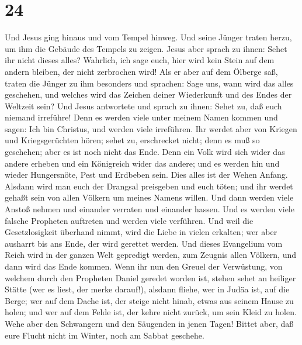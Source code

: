 \hypertarget{section-23}{%
\section{24}\label{section-23}}

 Und Jesus ging hinaus und vom Tempel hinweg. Und seine
Jünger traten herzu, um ihm die Gebäude des Tempels zu zeigen.
 Jesus aber sprach zu ihnen: Sehet ihr nicht dieses alles?
Wahrlich, ich sage euch, hier wird kein Stein auf dem andern bleiben,
der nicht zerbrochen wird!  Als er aber auf dem Ölberge
saß, traten die Jünger zu ihm besonders und sprachen: Sage uns, wann
wird das alles geschehen, und welches wird das Zeichen deiner
Wiederkunft und des Endes der Weltzeit sein?  Und Jesus
antwortete und sprach zu ihnen: Sehet zu, daß euch niemand irreführe!
 Denn es werden viele unter meinem Namen kommen und sagen:
Ich bin Christus, und werden viele irreführen.  Ihr werdet
aber von Kriegen und Kriegsgerüchten hören; sehet zu, erschrecket nicht;
denn es muß so geschehen; aber es ist noch nicht das Ende.
 Denn ein Volk wird sich wider das andere erheben und ein
Königreich wider das andere; und es werden hin und wieder Hungersnöte,
Pest und Erdbeben sein.  Dies alles ist der Wehen Anfang.
 Alsdann wird man euch der Drangsal preisgeben und euch
töten; und ihr werdet gehaßt sein von allen Völkern um meines Namens
willen.  Und dann werden viele Anstoß nehmen und einander
verraten und einander hassen.  Und es werden viele
falsche Propheten auftreten und werden viele verführen. 
Und weil die Gesetzlosigkeit überhand nimmt, wird die Liebe in vielen
erkalten;  wer aber ausharrt bis ans Ende, der wird
gerettet werden.  Und dieses Evangelium vom Reich wird in
der ganzen Welt gepredigt werden, zum Zeugnis allen Völkern, und dann
wird das Ende kommen.  Wenn ihr nun den Greuel der
Verwüstung, von welchem durch den Propheten Daniel geredet worden ist,
stehen sehet an heiliger Stätte (wer es liest, der merke darauf!),
 alsdann fliehe, wer in Judäa ist, auf die Berge;
 wer auf dem Dache ist, der steige nicht hinab, etwas aus
seinem Hause zu holen;  und wer auf dem Felde ist, der
kehre nicht zurück, um sein Kleid zu holen.  Wehe aber
den Schwangern und den Säugenden in jenen Tagen!  Bittet
aber, daß eure Flucht nicht im Winter, noch am Sabbat geschehe.
